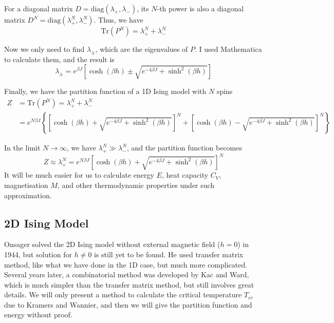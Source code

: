 \documentclass[11pt]{article}
\begin{document}
	For a diagonal matrix $D = \mathrm{diag}(\lambda_+, \lambda_-)$, its $N$-th power is also a diagonal matrix $D^N = \mathrm{diag}(\lambda_+^N, \lambda_-^N)$. Thus, we have
	\begin{equation} \label{eq:MatrixPNTraceDiagonal}
		\mathrm{Tr}(P^N) = \lambda_+^N + \lambda_-^N
	\end{equation}

	Now we only need to find $\lambda_\pm$, which are the eigenvalues of $P$. I used Mathematica to calculate them, and the result is
	\begin{equation} \label{eq:MatrixPEigenvalues}
		\lambda_\pm = e^{\beta J} \left[\cosh(\beta h) \pm \sqrt{e^{-4\beta J}+\sinh^2(\beta h)}\right]
	\end{equation}

	Finally, we have the partition function of a 1D Ising model with $N$ spins
	\begin{equation} \label{eq:PartitionFunction1DGeneralFinal}
		\begin{aligned}
			Z &= \mathrm{Tr}(P^N) = \lambda_+^N + \lambda_-^N \\
			&= e^{N \beta J} \left\{\left[\cosh(\beta h) + \sqrt{e^{-4\beta J}+\sinh^2(\beta h)}\right]^N
			 + \left[\cosh(\beta h) - \sqrt{e^{-4\beta J}+\sinh^2(\beta h)}\right]^N\right\}
		\end{aligned}
	\end{equation}

	In the limit $N \to \infty$, we have $\lambda_+^N \gg \lambda_-^N$, and the partition function becomes
		\begin{equation} \label{eq:PartitionFunction1DGeneralLimit}
			Z \approx \lambda_+^N = e^{N \beta J} \left[\cosh(\beta h) + \sqrt{e^{-4\beta J}+\sinh^2(\beta h)}\right]^N
		\end{equation}
	It will be much easier for us to calculate energy $E$, heat capacity $C_V$, magnetisation $M$, and other thermodynamic properties under such approximation.

	\subsection{2D Ising Model}
	
	Onsager solved the 2D Ising model without external magnetic field ($h = 0$) in 1944\cite{onsager_solution}, but solution for $h \neq 0$ is still yet to be found. He used transfer matrix method, like what we have done in the 1D case, but much more complicated. Several years later, a combinatorial method was developed by Kac and Ward\cite{KacWard1952}, which is much simpler than the transfer matrix method, but still involves great details. We will only present a method to calculate the critical temperature $T_{cr}$ due to Kramers and Wannier\cite{KramersWannier1941}, and then we will give the partition function and energy without proof.
\end{document}
